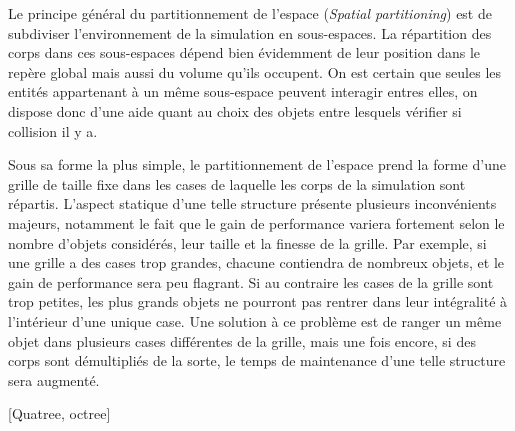 Le principe général du partitionnement de l'espace (\textit{Spatial
  partitioning}) est de subdiviser l'environnement de la simulation en
sous-espaces. La répartition des corps dans ces sous-espaces dépend
bien évidemment de leur position dans le repère global mais aussi du
volume qu'ils occupent. On est certain que seules les entités
appartenant à un même sous-espace peuvent interagir entres elles, on
dispose donc d'une aide quant au choix des objets entre lesquels
vérifier si collision il y a.

Sous sa forme la plus simple, le partitionnement de l'espace prend la
forme d'une grille de taille fixe dans les cases de laquelle les corps
de la simulation sont répartis. L'aspect statique d'une telle
structure présente plusieurs inconvénients majeurs, notamment le fait
que le gain de performance variera fortement selon le nombre d'objets
considérés, leur taille et la finesse de la grille. Par exemple, si
une grille a des cases trop grandes, chacune contiendra de nombreux
objets, et le gain de performance sera peu flagrant. Si au contraire
les cases de la grille sont trop petites, les plus grands objets ne
pourront pas rentrer dans leur intégralité à l'intérieur d'une unique
case. Une solution à ce problème est de ranger un même objet dans
plusieurs cases différentes de la grille, mais une fois encore, si des
corps sont démultipliés de la sorte, le temps de maintenance d'une
telle structure sera augmenté.

[Quatree, octree]

